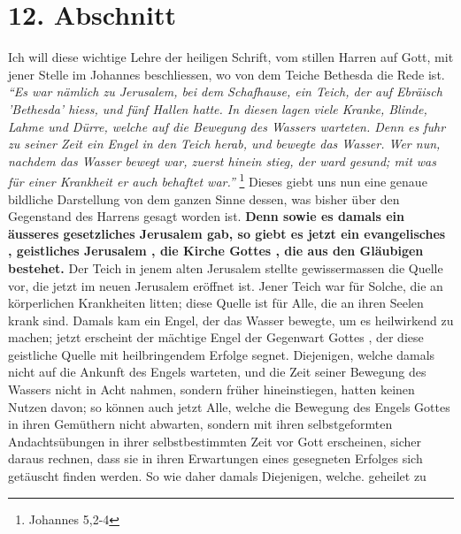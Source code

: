 \section{12. Abschnitt} \label{kap6_ab12}

Ich will diese wichtige Lehre der heiligen Schrift, vom stillen Harren auf Gott,
mit jener Stelle im Johannes beschliessen, wo von dem Teiche Bethesda
die Rede ist.
\textit{"`Es war nämlich zu Jerusalem, bei dem Schafhause, ein Teich, der
auf Ebräisch 'Bethesda' hiess, und fünf Hallen hatte. In diesen lagen viele
Kranke, Blinde, Lahme und Dürre, welche auf die Bewegung des Wassers warteten.
Denn es fuhr zu seiner Zeit ein Engel in den Teich herab, und bewegte das
Wasser. Wer nun, nachdem das Wasser bewegt war, zuerst hinein stieg, der ward
gesund; mit was für einer Krankheit er auch behaftet war."'}
\footnote{Johannes 5,2-4}
Dieses giebt uns nun eine genaue bildliche Darstellung von dem ganzen Sinne
dessen, was bisher über den Gegenstand des Harrens gesagt worden ist.
\textbf{Denn sowie
es damals ein äusseres gesetzliches Jerusalem 
gab, so giebt es jetzt ein
evangelisches  , geistliches Jerusalem
, die Kirche Gottes , die aus
den Gläubigen  
bestehet.} Der Teich in jenem alten Jerusalem 
stellte gewissermassen die Quelle
vor, die jetzt im neuen Jerusalem  eröffnet ist.
Jener Teich war für Solche, die
an körperlichen Krankheiten litten; diese Quelle ist für Alle, die an ihren
Seelen krank sind. Damals kam ein Engel, der das Wasser bewegte, um es
heilwirkend zu machen; jetzt erscheint der mächtige Engel  der
Gegenwart Gottes ,
der diese geistliche Quelle  mit heilbringendem Erfolge
segnet. Diejenigen,
welche damals nicht auf die Ankunft des Engels warteten, und die Zeit seiner
Bewegung des Wassers nicht in Acht nahmen, sondern früher hineinstiegen, hatten
keinen Nutzen davon; so können auch jetzt Alle, welche die Bewegung des Engels
Gottes in ihren Gemüthern nicht abwarten, sondern mit ihren selbstgeformten
Andachtsübungen in ihrer selbstbestimmten Zeit vor Gott erscheinen, sicher
daraus rechnen, dass sie in ihren Erwartungen eines gesegneten Erfolges sich
getäuscht finden werden. So wie daher damals Diejenigen, welche. geheilet zu
